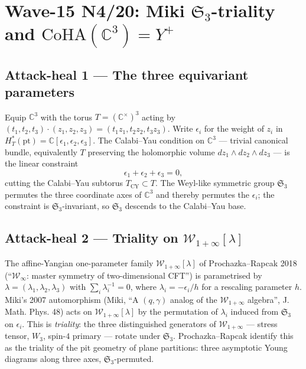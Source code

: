\providecommand{\C}{\mathbb{C}}
\providecommand{\Z}{\mathbb{Z}}
\providecommand{\N}{\mathbb{N}}
\providecommand{\gl}{\mathfrak{gl}}
\providecommand{\CoHA}{\mathrm{CoHA}}
\providecommand{\Winf}{\mathcal{W}_{1+\infty}}
\providecommand{\Yplus}{Y^{+}}
\providecommand{\Yminus}{Y^{-}}
\providecommand{\Yzero}{Y^{0}}
\providecommand{\Sthree}{\mathfrak{S}_{3}}
\providecommand{\kchir}{\kappa_{\mathrm{ch}}}
\providecommand{\kcat}{\kappa_{\mathrm{cat}}}

\section*{Wave-15 N4/20: Miki $\Sthree$-triality and $\CoHA(\C^{3}) = \Yplus$}

\subsection*{Attack-heal 1 --- The three equivariant parameters}

Equip $\C^{3}$ with the torus $T = (\C^{\times})^{3}$ acting by
$(t_{1}, t_{2}, t_{3}) \cdot (z_{1}, z_{2}, z_{3}) = (t_{1} z_{1},
t_{2} z_{2}, t_{3} z_{3})$.  Write $\epsilon_{i}$ for the weight of
$z_{i}$ in $H^{\ast}_{T}(\mathrm{pt}) = \C[\epsilon_{1}, \epsilon_{2},
\epsilon_{3}]$.  The Calabi--Yau condition on $\C^{3}$ --- trivial
canonical bundle, equivalently $T$ preserving the holomorphic volume
$dz_{1} \wedge dz_{2} \wedge dz_{3}$ --- is the linear constraint
\[
  \epsilon_{1} + \epsilon_{2} + \epsilon_{3} = 0,
\]
cutting the Calabi--Yau subtorus $T_{\mathrm{CY}} \subset T$.
The Weyl-like symmetric group $\Sthree$ permutes the three coordinate
axes of $\C^{3}$ and thereby permutes the $\epsilon_{i}$; the constraint
is $\Sthree$-invariant, so $\Sthree$ descends to the Calabi--Yau base.

\subsection*{Attack-heal 2 --- Triality on $\Winf[\lambda]$}

The affine-Yangian one-parameter family $\Winf[\lambda]$ of
Prochazka--Rapcak 2018 (``$\mathcal{W}_{\infty}$: master symmetry of
two-dimensional CFT'') is parametrised by
$\lambda = (\lambda_{1}, \lambda_{2}, \lambda_{3})$ with
$\sum_{i} \lambda_{i}^{-1} = 0$, where $\lambda_{i} = -\epsilon_{i}/h$
for a rescaling parameter $h$.  Miki's 2007 automorphism (Miki,
``A $(q, \gamma)$ analog of the $\mathcal{W}_{1+\infty}$ algebra'',
J. Math. Phys. 48) acts on $\Winf[\lambda]$ by the permutation of
$\lambda_{i}$ induced from $\Sthree$ on $\epsilon_{i}$.  This is
\emph{triality}: the three distinguished generators of $\Winf$ ---
stress tensor, $W_{3}$, spin-$4$ primary --- rotate under $\Sthree$.
Prochazka--Rapcak identify this as the triality of the pit geometry
of plane partitions: three asymptotic Young diagrams along three axes,
$\Sthree$-permuted.


